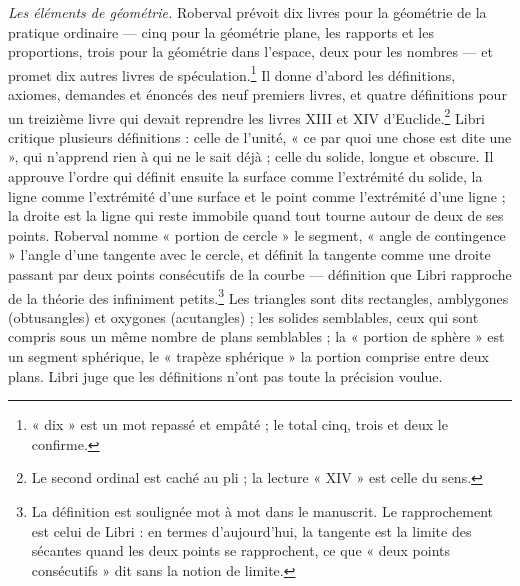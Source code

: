 \documentclass[11pt,a4paper]{article}
\begin{document}
\emph{Les éléments de géométrie.} Roberval prévoit dix livres pour la
géométrie de la pratique ordinaire — cinq pour la géométrie plane, les
rapports et les proportions, trois pour la géométrie dans l'espace, deux pour
les nombres — et promet dix autres livres de spéculation.\footnote{« dix » est
un mot repassé et empâté ; le total cinq, trois et deux le confirme.} Il donne
d'abord les définitions, axiomes, demandes et énoncés des neuf premiers
livres, et quatre définitions pour un treizième livre qui devait reprendre
les livres XIII et XIV d'Euclide.\footnote{Le second ordinal est caché au pli ;
la lecture « XIV » est celle du sens.} Libri critique plusieurs définitions :
celle de l'unité, « ce par quoi une chose est dite une », qui n'apprend rien
à qui ne le sait déjà ; celle du solide, longue et obscure. Il approuve
l'ordre qui définit ensuite la surface comme l'extrémité du solide, la ligne
comme l'extrémité d'une surface et le point comme l'extrémité d'une ligne ;
la droite est la ligne qui reste immobile quand tout tourne autour de deux de
ses points. Roberval nomme « portion de cercle » le segment, « angle de
contingence » l'angle d'une tangente avec le cercle, et définit la tangente
comme une droite passant par deux points consécutifs de la courbe — définition
que Libri rapproche de la théorie des infiniment petits.\footnote{La définition
est soulignée mot à mot dans le manuscrit. Le rapprochement est celui de
Libri : en termes d'aujourd'hui, la tangente est la limite des sécantes quand
les deux points se rapprochent, ce que « deux points consécutifs » dit sans
la notion de limite.} Les triangles sont dits rectangles, amblygones
(obtusangles) et oxygones (acutangles) ; les solides semblables, ceux qui
sont compris sous un même nombre de plans semblables ; la « portion de
sphère » est un segment sphérique, le « trapèze sphérique » la portion comprise
entre deux plans. Libri juge que les définitions n'ont pas toute la précision
voulue.
\end{document}
